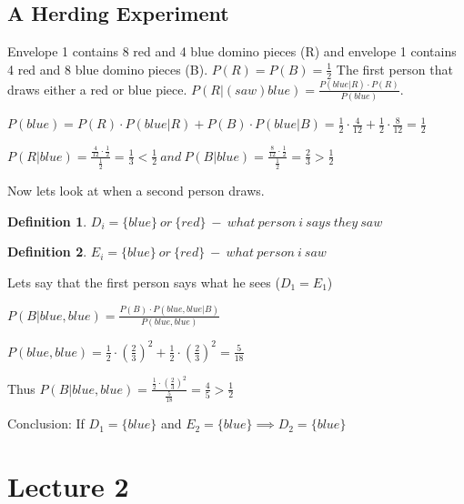 \documentclass[12pt]{scrartcl}
\newtheorem{defi}{Definition}
\begin{document}
\subsection{A Herding Experiment}
Envelope 1 contains 8 red and 4 blue domino pieces (R) and envelope 1 contains 4 red and 8 blue domino pieces (B).\newline
$P(R) = P(B) = \frac{1}{2} $\newline
The first person that draws either a red or blue piece.\newline
$P(R | (saw) blue) = \frac{P(blue | R)\cdot P(R)}{P(blue)}$.

\noindent$P(blue) = P(R)\cdot P(blue |R) + P(B)\cdot P(blue | B) = \frac{1}{2}\cdot \frac{4}{12} + \frac{1}{2}\cdot \frac{8}{12} = \frac{1}{2}$

\noindent$P(R | blue) = \frac{\frac{4}{12}\cdot \frac{1}{2}}{\frac{1}{2}} = \frac{1}{3} < \frac{1}{2}\
 and\ P(B | blue) = \frac{\frac{8}{12}\cdot \frac{1}{2}}{\frac{1}{2}} = \frac{2}{3} > \frac{1}{2}$



\noindent Now lets look at when a second person draws.
\begin{defi}
	$D_{i} = \{blue\}\ or\ \{red\}\ -\ what\ person\ i\ says\ they\ saw$
\end{defi}
\begin{defi}
$E_{i} = \{blue\}\ or\ \{red\}\ -\ what\ person\ i\ saw$
\end{defi}
\noindent Lets say that the first person says what he sees ($D_{1} = E_{1}$)

\noindent$P(B | blue, blue) = \frac{P(B)\cdot P(blue, blue | B)}{P(blue, blue)}$

\noindent$P(blue, blue) = \frac{1}{2}\cdot (\frac{2}{3})^{2} + \frac{1}{2}\cdot (\frac{2}{3})^{2} = \frac{5}{18}$

\noindent Thus $P(B | blue, blue) = \frac{\frac{1}{2}\cdot (\frac{2}{3})^{2}}{\frac{5}{18}} = \frac{4}{5} > \frac{1}{2}$

\noindent Conclusion: If $D_{1} = \{blue\}$ and $E_{2} = \{blue\} \implies D_{2} = \{blue \}$

\newpage
\section{Lecture 2} 
\end{document}

